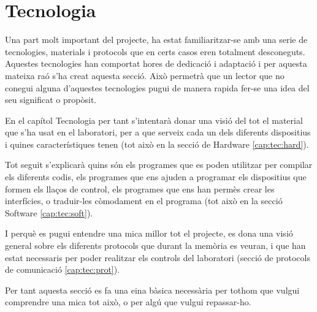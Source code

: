 
\chapter{Tecnologia}\label{cap:tec} %

\ifpdf
    \graphicspath{{2_technology/figures/PNG/}{2_technology/figures/PDF/}{2_technology/figures/}}
\else
    \graphicspath{{2_technology/figures/EPS/}{2_technology/figures/}}
\fi


Una part molt important del projecte, ha estat familiaritzar-se amb una serie de tecnologies, materials i protocols que en certs casos eren totalment desconeguts. Aquestes tecnologies han comportat hores de dedicació i adaptació i per aquesta mateixa raó s'ha creat aquesta secció. Això permetrà que un lector que no conegui alguna d'aquestes tecnologies pugui de manera rapida fer-se una idea del seu significat o propòsit.

En el capítol Tecnologia per tant s'intentarà donar una visió del tot el material que s'ha usat en el laboratori, per a que serveix cada un dels diferents dispositius i quines característiques tenen (tot això en la secció de Hardware \ref{cap:tec:hard}). 

Tot seguit s'explicarà quins són els programes que es poden utilitzar per compilar els diferents codis, els programes que ens ajuden a programar els dispositius que formen els llaços de control, els programes que ens han permès crear les interfícies, o traduir-les còmodament en el programa \DCSMonitor (tot això en la secció Software \ref{cap:tec:soft}).

I perquè es pugui entendre una mica millor tot el projecte, es dona una visió general sobre els diferents protocols que durant la memòria es veuran, i que han estat necessaris per poder realitzar els controls del laboratori (secció de protocols de comunicació \ref{cap:tec:prot}).

Per tant aquesta secció es fa una eina bàsica necessària per tothom que vulgui comprendre una mica tot això, o per algú que vulgui repassar-ho.

